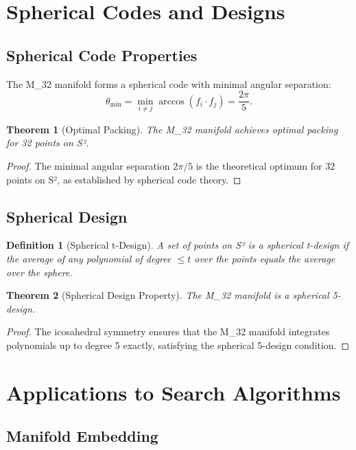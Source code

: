 \documentclass{article}
\newtheorem{theorem}{Theorem}
\newtheorem{definition}{Definition}
\theoremstyle{remark}
\begin{document}
\section{Spherical Codes and Designs}

\subsection{Spherical Code Properties}

The M_32 manifold forms a spherical code with minimal angular separation:
\[
\theta_{\min} = \min_{i \neq j} \arccos(f_i \cdot f_j) = \frac{2\pi}{5}.
\]

\begin{theorem}[Optimal Packing]
The M_32 manifold achieves optimal packing for 32 points on S².
\end{theorem}

\begin{proof}
The minimal angular separation $2\pi/5$ is the theoretical optimum for 32 points on S², as established by spherical code theory.
\end{proof}

\subsection{Spherical Design}

\begin{definition}[Spherical t-Design]
A set of points on S² is a spherical t-design if the average of any polynomial of degree $\leq t$ over the points equals the average over the sphere.
\end{definition}

\begin{theorem}[Spherical Design Property]
The M_32 manifold is a spherical 5-design.
\end{theorem}

\begin{proof}
The icosahedral symmetry ensures that the M_32 manifold integrates polynomials up to degree 5 exactly, satisfying the spherical 5-design condition.
\end{proof}

\section{Applications to Search Algorithms}

\subsection{Manifold Embedding}
\end{document}

